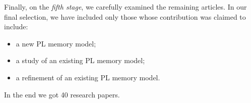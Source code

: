 Finally, on the \emph{fifth stage}, we carefully examined the remaining articles.
In our final selection, we have included only those whose contribution was claimed to include:
\begin{itemize}
  \item a new PL memory model;
  \item a study of an existing PL memory model;
  \item a refinement of an existing PL memory model.
\end{itemize}
In the end we got 40 research papers.

